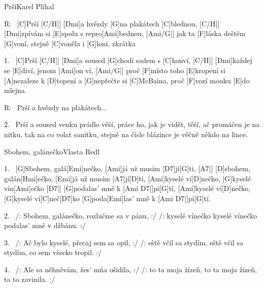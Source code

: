 \begin{song}{Prší}{Karel Plíhal}

\begin{xverse}{R:~}
[\large C]Prší [\large C/H|]{} [\large Dmi]a hvězdy [\large G]na plakátech [\large C]blednou, [\large C/H|]{}
[\large Dmi]zpívám si [\large E]spolu s repro[\large Ami]bednou, [\large Ami/G|]{}
jak ta [\large F]láska deštěm [\large G]voní,
stejně [\large C]voněla i [\large G]loni, zkrátka
\end{xverse}

\begin{xverse}{1.~}
[\large C]Prší [\large C/H|]{} [\large Dmi]a soused [\large G]chodí sadem s [\large C]konví, [\large C/H|]{}
[\large Dmi]každej se [\large E]diví, jenom [\large Ami]on ví, [\large Ami/G|]{}
proč [\large F]místo toho [\large E]kropení si [\large A]nezaleze k [\large D]topení
a [\large G]nepřečte si [\large C]McBaina, proč [\large F]vozí mouku [\large E]do mlejna.
\end{xverse}

\begin{xverse}{R:~}
Prší a hvězdy na plakátech...
\end{xverse}

\begin{xverse}{2.~}
Prší a soused venku prádlo věší,
práce ho, jak je vidět, těší,
ač promáčen je na nitku, tak na co volat sanitku,
stejně na čísle blázince je věčně někdo na lince.
\end{xverse}

\end{song}


\begin{song}{Sbohem, galánečko}{Vlasta Redl}

\begin{xverse}{1.~}
[\large G]Sbohem, galá[\large Emi]nečko, [\large Ami]já už musím [\large D7]jí[\large G]ti, [\large A7|]{}
[\large D]sbohem, galán[\large Hmi]ečko, [\large Emi]já už musím [\large A7]jí[\large D]ti,
[\large Ami]kyselé ví[\large D]nečko, [\large G]kyselé vín[\large Ami]ečko [\large D7|]{}  [\large G]podalas' mně k [\large Ami D7|]pi[\large G]tí,
[\large Ami]kyselé ví[\large D]nečko, [\large G]kyselé ví[\large C]neč[\large D7]ko [\large G]poda[\large Emi]las' mně k [\large Ami D7|]pi[\large G]tí.
\end{xverse}

\begin{xverse}{2.~}
/: Sbohem, galánečko, rozlučme sa v pánu, :/
/: kyselé vínečko kyselé vínečko podalas' mně v džbánu. :/
\end{xverse}

\begin{xverse}{3.~}
/: Ač bylo kyselé, přecaj sem sa opil, :/
/: eště včil sa stydím, eště včil sa stydím, co sem všecko tropil. :/
\end{xverse}

\begin{xverse}{4.~}
/: Ale sa něhněvám, žes' mňa ošidila, :/
/: to ta moja žízeň, to ta moja žízeň, ta to zavinila. :/
\end{xverse}

\end{song}


